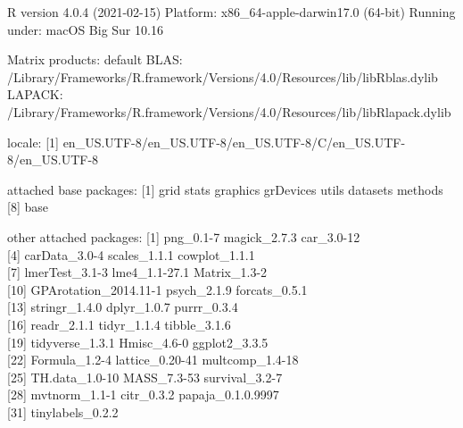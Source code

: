 \documentclass[
  english,
  man, noextraspace,floatsintext]{apa7}
\begin{document}
\begin{appendix}
R version 4.0.4 (2021-02-15) Platform: x86\_64-apple-darwin17.0 (64-bit)
Running under: macOS Big Sur 10.16

Matrix products: default BLAS:
/Library/Frameworks/R.framework/Versions/4.0/Resources/lib/libRblas.dylib
LAPACK:
/Library/Frameworks/R.framework/Versions/4.0/Resources/lib/libRlapack.dylib

locale: {[}1{]}
en\_US.UTF-8/en\_US.UTF-8/en\_US.UTF-8/C/en\_US.UTF-8/en\_US.UTF-8

attached base packages: {[}1{]} grid stats graphics grDevices utils
datasets methods\\
{[}8{]} base

other attached packages: {[}1{]} png\_0.1-7 magick\_2.7.3 car\_3.0-12\\
{[}4{]} carData\_3.0-4 scales\_1.1.1 cowplot\_1.1.1\\
{[}7{]} lmerTest\_3.1-3 lme4\_1.1-27.1 Matrix\_1.3-2\\
{[}10{]} GPArotation\_2014.11-1 psych\_2.1.9 forcats\_0.5.1\\
{[}13{]} stringr\_1.4.0 dplyr\_1.0.7 purrr\_0.3.4\\
{[}16{]} readr\_2.1.1 tidyr\_1.1.4 tibble\_3.1.6\\
{[}19{]} tidyverse\_1.3.1 Hmisc\_4.6-0 ggplot2\_3.3.5\\
{[}22{]} Formula\_1.2-4 lattice\_0.20-41 multcomp\_1.4-18\\
{[}25{]} TH.data\_1.0-10 MASS\_7.3-53 survival\_3.2-7\\
{[}28{]} mvtnorm\_1.1-1 citr\_0.3.2 papaja\_0.1.0.9997\\
{[}31{]} tinylabels\_0.2.2


\end{appendix}
\end{document}

